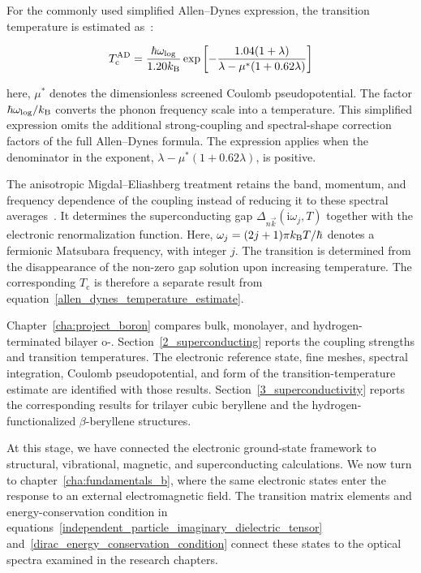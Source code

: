 For the commonly used simplified Allen--Dynes expression,
the transition temperature is estimated as~\cite{allen-dynes}:

\begin{equation}
    T_\mathrm{c}^{\mathrm{AD}}
    =
    \frac{\hbar\omega_\mathrm{log}}{1.20k_\mathrm{B}}
    \exp\left[
    -\frac{1.04(1+\lambda)}
    {\lambda-\mu^*(1+0.62\lambda)}
    \right]
\label{allen_dynes_temperature_estimate}
\end{equation}

here, $\mu^*$ denotes the dimensionless screened Coulomb pseudopotential.
The factor $\hbar\omega_\mathrm{log}/k_\mathrm{B}$ converts the phonon frequency scale into a temperature.
This simplified expression omits the additional strong-coupling and spectral-shape correction factors of the full Allen--Dynes formula.
The expression applies when the denominator in the exponent, $\lambda-\mu^*(1+0.62\lambda)$, is positive.

The anisotropic Migdal--Eliashberg treatment retains the band, momentum, and frequency dependence of the coupling instead of reducing it to these spectral averages~\cite{margine2013anisotropic}.
It determines the superconducting gap $\Delta_{n\vec{k}}(\mathrm{i}\omega_j,T)$ together with the electronic renormalization function.
Here, $\omega_j=(2j+1)\mathrm{\pi}k_\mathrm{B} T/\hbar$ denotes a fermionic Matsubara frequency, with integer $j$.
The transition is determined from the disappearance of the non-zero gap solution upon increasing temperature.
The corresponding $T_\mathrm{c}$ is therefore a separate result from equation~\eqref{allen_dynes_temperature_estimate}.

Chapter~\ref{cha:project_boron} compares bulk, monolayer, and hydrogen-terminated bilayer o-.
Section~\ref{2_superconducting} reports the coupling strengths and transition temperatures.
The electronic reference state, fine meshes, spectral integration, Coulomb pseudopotential, and form of the transition-temperature estimate are identified with those results.
Section~\ref{3_superconductivity} reports the corresponding results for trilayer cubic beryllene and the hydrogen-functionalized $\beta$-beryllene structures.

At this stage, we have connected the electronic ground-state framework to structural, vibrational, magnetic, and superconducting calculations.
We now turn to chapter~\ref{cha:fundamentals_b},
where the same electronic states enter the response to an external electromagnetic field.
The transition matrix elements and energy-conservation condition in equations~\eqref{independent_particle_imaginary_dielectric_tensor} and~\eqref{dirac_energy_conservation_condition}
connect these states to the optical spectra examined in the research chapters.




